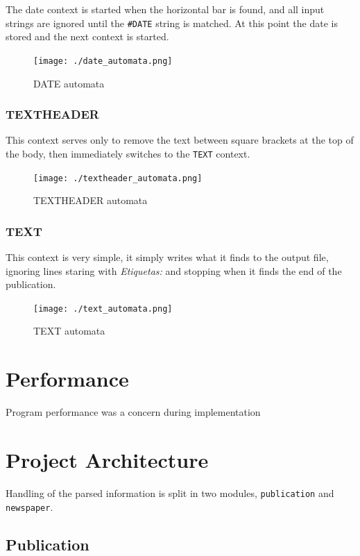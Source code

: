 \documentclass[a4paper]{article}
\begin{document}
The date context is started when the horizontal bar is found, and all input strings are ignored until the \texttt{\#DATE} string is matched. At this point the date is stored and the next context is started.

\begin{figure}[H]
    \centering
    \texttt{[image: ./date\_automata.png]}
    \caption{DATE automata}
\end{figure}

\subsubsection{TEXTHEADER}

This context serves only to remove the text between square brackets at the top
of the body, then immediately switches to the \texttt{TEXT} context.

\begin{figure}[H]
    \centering
    \texttt{[image: ./textheader\_automata.png]}
    \caption{TEXTHEADER automata}
\end{figure}

\subsubsection{TEXT}

This context is very simple, it simply writes what it finds to the output file,
ignoring lines staring with \textit{Etiquetas:} and stopping when it finds the
end of the publication.

\begin{figure}[H]
    \centering
    \texttt{[image: ./text\_automata.png]}
    \caption{TEXT automata}
\end{figure}

\section{Performance}

Program performance was a concern during implementation

\section{Project Architecture}

Handling of the parsed information is split in two modules, \texttt{publication} and \texttt{newspaper}.

\subsection{Publication}
\end{document}
